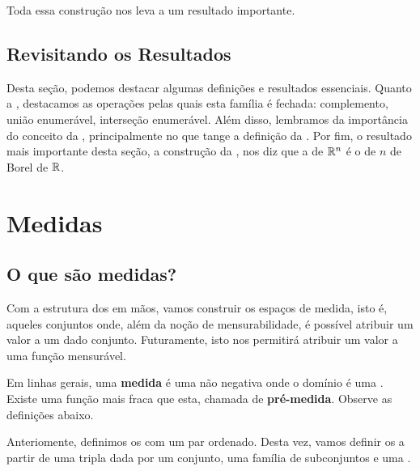 Toda essa construção nos leva a um resultado importante.

\productSigmaAlgebraOfRn

\subsection*{Revisitando os Resultados}
Desta seção, podemos destacar algumas definições e resultados essenciais. Quanto a , destacamos as operações pelas quais esta família é fechada: complemento, união enumerável, interseção enumerável. Além disso, lembramos da importância do conceito da , principalmente no que tange a definição da . Por fim, o resultado mais importante desta seção, a construção da , nos diz que a  de $\mathbb{R}^n$ é o  de $n$ \sigmaAlgs de Borel de $\mathbb{R}$.














\section{Medidas}

\subsection{O que são medidas?}
Com a estrutura dos  em mãos, vamos construir os espaços de medida, isto é, aqueles conjuntos onde, além da noção de mensurabilidade, é possível atribuir um valor a um dado conjunto. Futuramente, isto nos permitirá atribuir um valor a uma função mensurável.

Em linhas gerais, uma \textbf{medida} é uma  não negativa onde o domínio é uma . Existe uma função mais fraca que esta, chamada de \textbf{pré-medida}. Observe as definições abaixo.

\preMeasure
\measure

Anteriomente, definimos os  com um par ordenado. Desta vez, vamos definir os  a partir de uma tripla dada por um conjunto, uma família de subconjuntos e uma .

